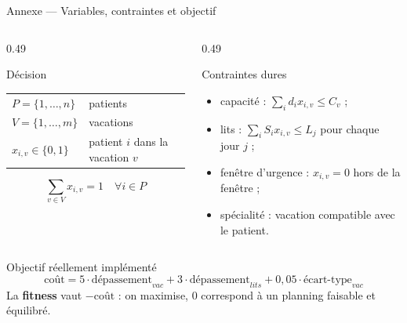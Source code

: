 \begin{frame}{Annexe --- Variables, contraintes et objectif}
  \scriptsize
  \begin{columns}[T,onlytextwidth]
    \begin{column}{0.49\textwidth}
      \begin{block}{Décision}
        \begin{tabular}{@{}ll@{}}
          $P=\{1,\dots,n\}$ & patients \\
          $V=\{1,\dots,m\}$ & vacations \\
          $x_{i,v}\in\{0,1\}$ & patient $i$ dans la vacation $v$ \\
        \end{tabular}
        \[
          \sum_{v\in V} x_{i,v}=1 \quad \forall i\in P
        \]
      \end{block}
    \end{column}

    \begin{column}{0.49\textwidth}
      \begin{block}{Contraintes dures}
        \begin{itemize}
          \item capacité : $\sum_i d_i x_{i,v}\le C_v$ ;
          \item lits : $\sum_i S_i x_{i,v}\le L_j$ pour chaque jour $j$ ;
          \item fenêtre d'urgence : $x_{i,v}=0$ hors de la fenêtre ;
          \item spécialité : vacation compatible avec le patient.
        \end{itemize}
      \end{block}
    \end{column}
  \end{columns}

  \vspace{0.12cm}
  \begin{alertblock}{Objectif réellement implémenté}
    \[
      \text{coût}=5\cdot\text{dépassement}_{vac}
      +3\cdot\text{dépassement}_{lits}
      +0{,}05\cdot\text{écart-type}_{vac}
    \]
    La \textbf{fitness} vaut $-\text{coût}$ : on maximise, $0$ correspond à un
    planning faisable et équilibré.
  \end{alertblock}
\end{frame}

